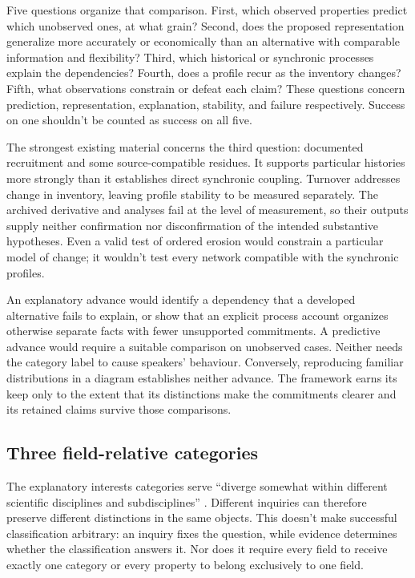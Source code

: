 \documentclass[12pt]{article}
\begin{document}
Five questions organize that comparison. First, which observed properties predict which unobserved ones, at what grain? Second, does the proposed representation generalize more accurately or economically than an alternative with comparable information and flexibility? Third, which historical or synchronic processes explain the dependencies? Fourth, does a profile recur as the inventory changes? Fifth, what observations constrain or defeat each claim? These questions concern prediction, representation, explanation, stability, and failure respectively. Success on one shouldn't be counted as success on all five.

The strongest existing material concerns the third question: documented recruitment and some source-compatible residues. It supports particular histories more strongly than it establishes direct synchronic coupling. Turnover addresses change in inventory, leaving profile stability to be measured separately. The archived derivative and  analyses fail at the level of measurement, so their outputs supply neither confirmation nor disconfirmation of the intended substantive hypotheses. Even a valid test of ordered erosion would constrain a particular model of change; it wouldn't test every network compatible with the synchronic profiles.

An explanatory advance would identify a dependency that a developed alternative fails to explain, or show that an explicit process account organizes otherwise separate facts with fewer unsupported commitments. A predictive advance would require a suitable comparison on unobserved cases. Neither needs the category label to cause speakers' behaviour. Conversely, reproducing familiar distributions in a diagram establishes neither advance. The framework earns its keep only to the extent that its distinctions make the commitments clearer and its retained claims survive those comparisons.

\subsection{Three field-relative categories}\label{sec:fieldrelative-nodes}

The explanatory interests categories serve \enquote{diverge somewhat within different scientific disciplines and subdisciplines} \citep[71]{khalidi2013}. Different inquiries can therefore preserve different distinctions in the same objects. This doesn't make successful classification arbitrary: an inquiry fixes the question, while evidence determines whether the classification answers it. Nor does it require every field to receive exactly one category or every property to belong exclusively to one field.
\end{document}
